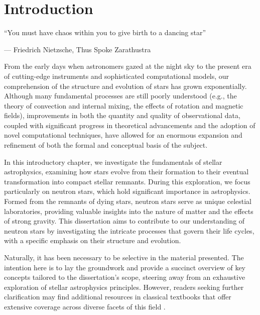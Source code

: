 \documentclass[main.tex]{subfiles}
\begin{document}
    \chapter{Introduction}
    \setlength{\epigraphwidth}{0.8\textwidth}
        \epigraph{
            ``You must have chaos within you to give birth to a dancing star''
    }{--- Friedrich Nietzsche, Thus Spoke Zarathustra}


    From the early days when astronomers gazed at the night sky to the present era of cutting-edge instruments and sophisticated computational models, our comprehension of the structure and evolution of stars has grown exponentially. Although many fundamental processes are still poorly understood (e.g., the theory of convection and internal mixing, the effects of rotation and magnetic fields), improvements in both the quantity and quality of observational data, coupled with significant progress in theoretical advancements and the adoption of novel computational techniques, have allowed for an enormous expansion and refinement of both the formal and conceptual basis of the subject.

    In this introductory chapter, we investigate the fundamentals of stellar astrophysics, examining how stars evolve from their formation to their eventual transformation into compact stellar remnants. During this exploration, we focus particularly on neutron stars, which hold significant importance in astrophysics. Formed from the remnants of dying stars, neutron stars serve as unique celestial laboratories, providing valuable insights into the nature of matter and the effects of strong gravity. This dissertation aims to contribute to our understanding of neutron stars by investigating the intricate processes that govern their life cycles, with a specific emphasis on their structure and evolution.

    Naturally, it has been necessary to be selective in the material presented. The intention here is to lay the groundwork and provide a succinct overview of key concepts tailored to the dissertation's scope, steering away from an exhaustive exploration of stellar astrophysics principles. However, readers seeking further clarification may find additional resources in classical textbooks that offer extensive coverage across diverse facets of this field \citep[e.g.,][]{Clayton, Prialnik, Eggleton, Kippenhahn, Carroll_Ostlie_2017}.
\end{document}

